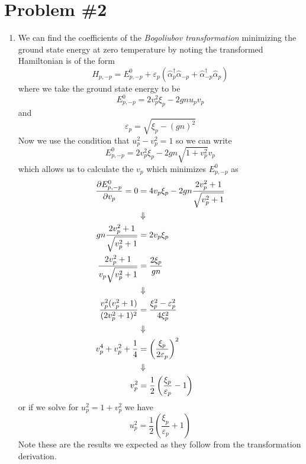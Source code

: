 \documentclass[11pt]{article}
\numberwithin{equation}{section}
\newcommand{\alphaH}{\hat{\alpha}}
\newcommand{\alphaHD}{\hat{\alpha}^{\dagger}}
\begin{document}
\section{Problem \#2}
\begin{enumerate}[(1)]
\item We can find the coefficients of the \emph{Bogoliubov transformation} minimizing the 
ground state energy at zero temperature by noting the transformed Hamiltonian is of the form
$$H_{p,-p} = E^{0}_{p,-p} + \varepsilon_{p}\left(\alphaHD_{p}\alphaH_{-p}+\alphaHD_{-p}\alphaH_{p}\right)$$
where we take the ground state energy to be
$$E^{0}_{p,-p} = 2v_p^2\xi_p-2gnu_pv_p$$
and 
$$\varepsilon_p = \sqrt{\xi_p-(gn)^2}$$
Now we use the condition that $u_p^2-v_p^2=1$ so we can write
$$E^{0}_{p,-p} = 2v_p^2\xi_p-2gn\sqrt{1+v_p^2}v_p$$
which allows us to calculate the $v_p$ which minimizes $E^0_{p,-p}$ as
\begin{align*}
\frac{\partial{E_{p,-p}^{0}}}{\partial{v_p}} = 0 &= 4v_p\xi_p - 2gn\frac{2v_p^2+1}{\sqrt{v_p^2+1}}\\
&\Downarrow\\
gn\frac{2v_p^2+1}{\sqrt{v_p^2+1}} &= 2v_p\xi_p \\
\frac{2v_p^2+1}{v_p\sqrt{v_p^2+1}} &= \frac{2\xi_p}{gn} \\
&\Downarrow\\
\frac{v_p^2(v_p^2+1)}{(2v_p^2+1)^2} &= \frac{\xi_p^2-\varepsilon_p^2}{4\xi_p^2} \\
&\Downarrow\\
v_p^4+v_p^2+\frac{1}{4} &= \left(\frac{\xi_p}{2\varepsilon_p}\right)^2\\
&\Downarrow\\
v_p^2 &= \frac{1}{2}\left(\frac{\xi_p}{\varepsilon_p}-1\right)
\end{align*}
or if we solve for $u_p^2 = 1+v_p^2$ we have
$$u_p^2 = \frac{1}{2}\left(\frac{\xi_p}{\varepsilon_p}+1\right)$$
Note these are the results we expected as they follow from the transformation derivation.
\end{enumerate}

\pagebreak
\end{document}
